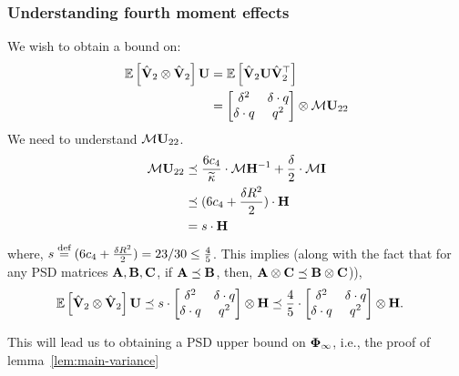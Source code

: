\subsubsection{Understanding fourth moment effects}\label{ssec:fourthMomentEffects}
We wish to obtain a bound on:
\begin{align*}
\mathbb{E}\left[\hat{\mathbf{V}}_2\otimes\hat{\mathbf{V}}_2\right]\mathbf{U}&=\mathbb{E}\left[\hat{\mathbf{V}}_2\mathbf{U}\hat{\mathbf{V}}_2^{\top}\right]\\
&=\begin{bmatrix}\delta^2&\delta\cdot q \\\delta\cdot q &q ^2\end{bmatrix}\otimes\mathcal{M}\mathbf{U}_{22}
\end{align*}
We need to understand $\mathcal{M}\mathbf{U}_{22}$. 
\begin{align}
\label{eq:MU22}
\mathcal{M}\mathbf{U}_{22}&\preceq\frac{6c_4}{\widetilde{\kappa}}\cdot\mathcal{M}{\mathbf{H}}^{-1}+\frac{\delta}{2}\cdot\mathcal{M}\mathbf{I}\nonumber\\
&\preceq(6c_4+\frac{\delta R^2}{2})\cdot\mathbf{H}\nonumber\\
&=s\cdot\mathbf{H}
\end{align}
where, $s\stackrel{\textrm{def}}{=} (6c_4+\frac{\delta R^2}{2})=23/30\leq \frac{4}{5}$. This implies (along with the fact that for any PSD matrices $\mathbf{A},\mathbf{B},\mathbf{C}$, if $\mathbf{A}\preceq\mathbf{B}$, then, $\mathbf{A}\otimes\mathbf{C}\preceq\mathbf{B}\otimes\mathbf{C}$)),
\begin{align}
\label{eq:fourthMomentAccBound}
\mathbb{E}\left[\hat{\mathbf{V}}_2\otimes\hat{\mathbf{V}}_2\right]\mathbf{U}&\preceq s\cdot\begin{bmatrix}\delta^2&\delta\cdot q \\\delta\cdot q &q ^2\end{bmatrix}\otimes\mathbf{H} \preceq \frac{4}{5}\cdot\begin{bmatrix}\delta^2&\delta\cdot q \\\delta\cdot q &q ^2\end{bmatrix}\otimes\mathbf{H}.
\end{align}


This will lead us to obtaining a PSD upper bound on $\boldsymbol{\Phi}_{\infty}$, i.e., the proof of lemma~\ref{lem:main-variance}

